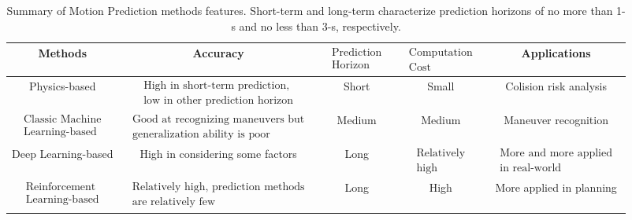 \begin{table}[h!]
	\centering
	\caption[Summary of Motion Prediction methods features]{Summary of Motion Prediction methods features. Short-term and long-term characterize prediction horizons of no more than 1-s and no less than 3-s, respectively.}
\begin{adjustbox}{max width=\textwidth}
\begin{tabular}{|c|c|c|c|c|}
	\hline
	Methods & Accuracy & $\begin{array}{l}\text { Prediction } \\
		\text { Horizon }\end{array}$ & $\begin{array}{l}\text { Computation } \\
		\text { Cost }\end{array}$ & Applications \\ \hline 
	
	Physics-based & $\begin{array}{l}\text { High in short-term prediction,  } \\
		\text { low in other prediction horizon }\end{array}$ & Short & Small & Colision risk analysis \\ \hline
	 $\begin{array}{l}\text { Classic Machine } \\
		\text { Learning-based }\end{array}$ & $\begin{array}{l}\text { Good at recognizing maneuvers but } \\
		\text { generalization ability is poor }\end{array}$ & Medium & Medium & Maneuver recognition \\ \hline
	
	 Deep Learning-based & High in considering some factors & Long & $\begin{array}{l}\text { Relatively } \\
		\text { high }\end{array}$ & $\begin{array}{l}\text { More and more applied } \\
		\text { in real-world }\end{array}$ \\ \hline
	
	 $\begin{array}{l}\text { Reinforcement } \\
		\text { Learning-based }\end{array}$ & $\begin{array}{l}\text { Relatively high, prediction methods  } \\
		\text { are relatively few }\end{array}$ & Long & High & More applied in planning \\
	\hline
\end{tabular}
\label{table:2_summary_mp_methods}
\end{adjustbox}
\end{table}

